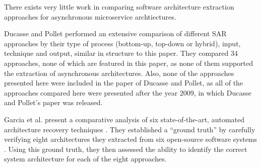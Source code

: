 There exists very little work in comparing software architecture extraction approaches for asynchronous microservice archtiectures.

Ducasse and Pollet \cite{Ducasse2009} performed an extensive comparison of different SAR approaches by their type of process (bottom-up, top-down or hybrid), input, technique and output, similar in structure to this paper.
They compared 34 approaches, none of which are featured in this paper, as none of them supported the extraction of asynchronous architectures.
Also, none of the approaches presented here were included in the paper of Ducasse and Pollet, as all of the approaches compared here were presented after the year 2009, in which Ducasse and Pollet's paper was released.

Garcia et al. present a comparative analysis of six state-of-the-art, automated architecture recovery techniques \cite{Garcia2013comparative}.
They established a ``ground truth'' by carefully verifying eight architectures they extracted from six open-source software systems \cite{Garcia2013comparative}.
Using this ground truth, they then assessed the ability to identify the correct system architecture for each of the eight approaches.